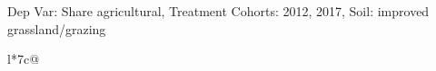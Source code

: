 \begin{table}[H]
\captionlistentry[table]{}
\label{table:beaver_land_class_DVis_land_class_1_SCg12_SSIGRG}
\scriptsize %
Dep Var: Share agricultural, Treatment Cohorts: 2012, 2017, Soil: improved grassland/grazing \\
\begin{threeparttable}
\begin{tabulary}{\textwidth}{l*{7}{c}@{}}
\toprule \toprule
\noalign{\smallskip}
\noalign{\smallskip}
\midrule \bottomrule
\end{tabulary}
\medskip
\end{threeparttable}
\end{table}
